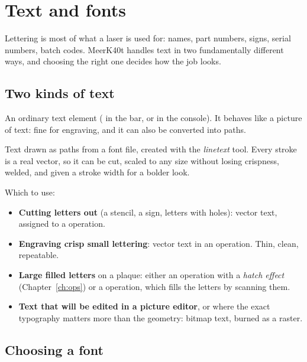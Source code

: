 \chapter{Text and fonts}
\label{ch:text}

Lettering is most of what a laser is used for: names, part numbers, signs, serial
numbers, batch codes. MeerK40t handles text in two fundamentally different ways,
and choosing the right one decides how the job looks.

\section{Two kinds of text}

\begin{description}[leftmargin=1.4em,style=nextline]
  \item[Bitmap text] An ordinary text element ( in the 
        bar, or  in the console). It behaves like a picture of
        text: fine for engraving, and it can also be converted into paths.
  \item[Vector text] Text drawn as paths from a font file, created with the
        \emph{linetext} tool. Every stroke is a real vector, so it can be cut,
        scaled to any size without losing crispness, welded, and given a stroke
        width for a bolder look.
\end{description}

\noindent Which to use:

\begin{itemize}
  \item \textbf{Cutting letters out} (a stencil, a sign, letters with holes):
        vector text, assigned to a  operation.
  \item \textbf{Engraving crisp small lettering}: vector text in an
         operation. Thin, clean, repeatable.
  \item \textbf{Large filled letters} on a plaque: either an 
        operation with a \emph{hatch effect} (Chapter~\ref{ch:ops}) or a
         operation, which fills the letters by scanning them.
  \item \textbf{Text that will be edited in a picture editor}, or where the
        exact typography matters more than the geometry: bitmap text, burned as
        a raster.
\end{itemize}

\section{Choosing a font}

